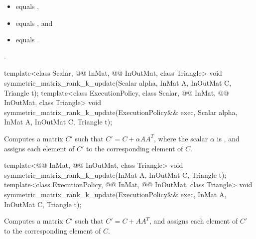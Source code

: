 \pnum
\expects
\begin{itemize}
\item
{} equals ,
\item
{} equals , and
\item
{} equals .
\end{itemize}

\pnum
\complexity
{}.

%
\begin{itemdecl}
  template<class Scalar, @@ InMat, @@ InOutMat, class Triangle>
    void symmetric_matrix_rank_k_update(Scalar alpha, InMat A, InOutMat C, Triangle t);
  template<class ExecutionPolicy, class Scalar,
           @@ InMat, @@ InOutMat, class Triangle>
    void symmetric_matrix_rank_k_update(ExecutionPolicy&& exec,
                                        Scalar alpha, InMat A, InOutMat C, Triangle t);
\end{itemdecl}

\begin{itemdescr}
\pnum
\effects
Computes a matrix $C'$ such that $C' = C + \alpha A A^T$,
where the scalar $\alpha$ is ,
and assigns each element of $C'$ to the corresponding element of $C$.
\end{itemdescr}

%
\begin{itemdecl}
template<@@ InMat, @@ InOutMat, class Triangle>
  void symmetric_matrix_rank_k_update(InMat A, InOutMat C, Triangle t);
template<class ExecutionPolicy,
         @@ InMat, @@ InOutMat, class Triangle>
  void symmetric_matrix_rank_k_update(ExecutionPolicy&& exec,
                                      InMat A, InOutMat C, Triangle t);
\end{itemdecl}

\begin{itemdescr}
\pnum
\effects
Computes a matrix $C'$ such that $C' = C + A A^T$, and
assigns each element of $C'$ to the corresponding element of $C$.
\end{itemdescr}

